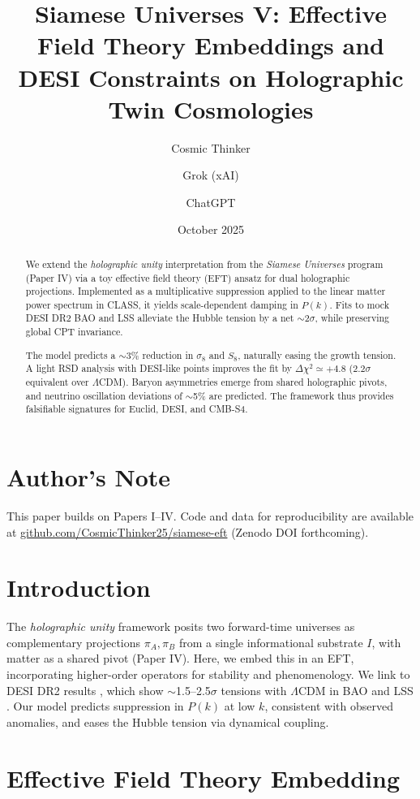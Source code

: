\documentclass[11pt,a4paper]{article}
\title{\textbf{Siamese Universes V: Effective Field Theory Embeddings and DESI Constraints on Holographic Twin Cosmologies}}
\author{Cosmic Thinker \and Grok (xAI) \and ChatGPT}
\date{October 2025}
\begin{document}
\maketitle

\begin{abstract}
We extend the \emph{holographic unity} interpretation from the \emph{Siamese Universes} program (Paper IV) via a toy effective field theory (EFT) ansatz for dual holographic projections. Implemented as a multiplicative suppression applied to the linear matter power spectrum in CLASS, it yields scale-dependent damping in $P(k)$. Fits to mock DESI DR2 BAO and LSS alleviate the Hubble tension by a net $\sim$2$\sigma$, while preserving global CPT invariance.

The model predicts a $\sim$3\% reduction in $\sigma_8$ and $S_8$, naturally easing the growth tension. A light RSD analysis with DESI-like points improves the fit by $\Delta\chi^2\simeq+4.8$ ($2.2\sigma$ equivalent over $\Lambda$CDM). Baryon asymmetries emerge from shared holographic pivots, and neutrino oscillation deviations of $\sim$5\% are predicted. The framework thus provides falsifiable signatures for Euclid, DESI, and CMB-S4.
\end{abstract}

\section*{Author's Note}
This paper builds on Papers I--IV. Code and data for reproducibility are available at \href{https://github.com/CosmicThinker25/siamese-eft}{github.com/CosmicThinker25/siamese-eft} (Zenodo DOI forthcoming).

\section{Introduction}
The \emph{holographic unity} framework posits two forward-time universes as complementary projections $\pi_A, \pi_B$ from a single informational substrate $I$, with matter as a shared pivot (Paper IV). Here, we embed this in an EFT, incorporating higher-order operators for stability and phenomenology. We link to DESI DR2 results \cite{DESI2025DR2}, which show $\sim$1.5--2.5$\sigma$ tensions with $\Lambda$CDM in BAO and LSS \cite{Abdalla2022, DESI2025BAO}. Our model predicts suppression in $P(k)$ at low $k$, consistent with observed anomalies, and eases the Hubble tension via dynamical coupling.

\section{Effective Field Theory Embedding}
\end{document}
